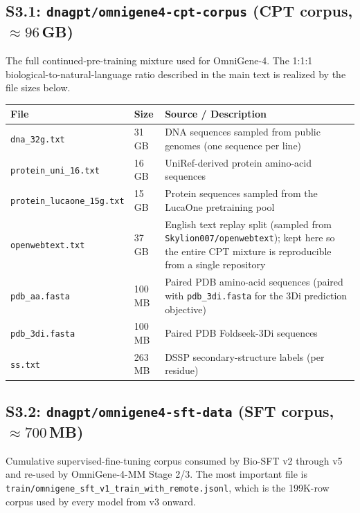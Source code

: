 \documentclass[11pt]{article}
\begin{document}
\subsection*{S3.1: \texttt{dnagpt/omnigene4-cpt-corpus} (CPT corpus, $\approx 96$\,GB)}

The full continued-pre-training mixture used for OmniGene-4. The 1{:}1{:}1
biological-to-natural-language ratio described in the main text is realized
by the file sizes below.

\begin{table}[H]
\centering
\small
\begin{tabular}{lll}
\toprule
\textbf{File} & \textbf{Size} & \textbf{Source / Description} \\
\midrule
\texttt{dna\_32g.txt}              & 31\,GB & DNA sequences sampled from public genomes (one sequence per line) \\
\texttt{protein\_uni\_16.txt}      & 16\,GB & UniRef-derived protein amino-acid sequences \\
\texttt{protein\_lucaone\_15g.txt} & 15\,GB & Protein sequences sampled from the LucaOne pretraining pool \\
\texttt{openwebtext.txt}           & 37\,GB & English text replay split (sampled from \texttt{Skylion007/openwebtext}); kept here so the entire CPT mixture is reproducible from a single repository \\
\texttt{pdb\_aa.fasta}             & 100\,MB & Paired PDB amino-acid sequences (paired with \texttt{pdb\_3di.fasta} for the 3Di prediction objective) \\
\texttt{pdb\_3di.fasta}            & 100\,MB & Paired PDB Foldseek-3Di sequences \\
\texttt{ss.txt}                    & 263\,MB & DSSP secondary-structure labels (per residue) \\
\bottomrule
\end{tabular}
\end{table}

\subsection*{S3.2: \texttt{dnagpt/omnigene4-sft-data} (SFT corpus, $\approx 700$\,MB)}

Cumulative supervised-fine-tuning corpus consumed by Bio-SFT v2 through v5
and re-used by OmniGene-4-MM Stage 2/3. The most important file is
\texttt{train/omnigene\_sft\_v1\_train\_with\_remote.jsonl}, which is the
199K-row corpus used by every model from v3 onward.
\end{document}
